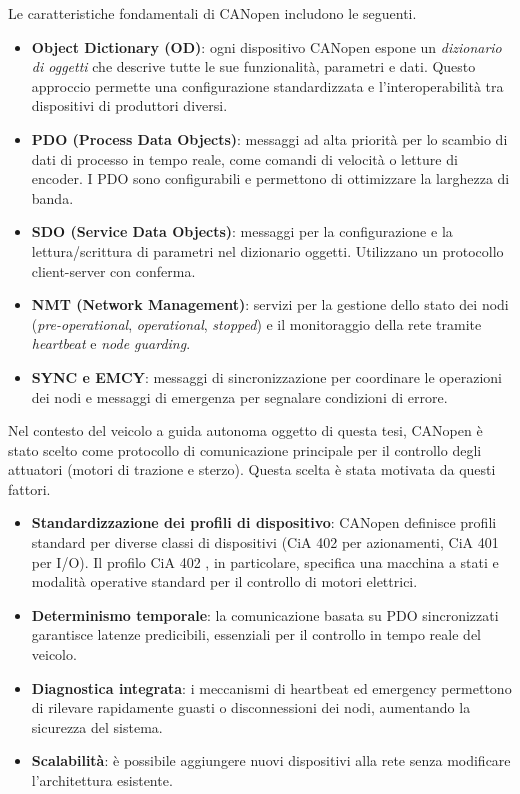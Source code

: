 Le caratteristiche fondamentali di CANopen includono le seguenti.
\begin{itemize}
    \item \textbf{Object Dictionary (OD)}: ogni dispositivo CANopen espone un \textit{dizionario di oggetti} che descrive tutte le sue funzionalità, parametri e dati. Questo approccio permette una configurazione standardizzata e l'interoperabilità tra dispositivi di produttori diversi.
    \item \textbf{PDO (Process Data Objects)}: messaggi ad alta priorità per lo scambio di dati di processo in tempo reale, come comandi di velocità o letture di encoder. I PDO sono configurabili e permettono di ottimizzare la larghezza di banda.
    \item \textbf{SDO (Service Data Objects)}: messaggi per la configurazione e la lettura/scrittura di parametri nel dizionario oggetti. Utilizzano un protocollo client-server con conferma.
    \item \textbf{NMT (Network Management)}: servizi per la gestione dello stato dei nodi (\textit{pre-operational}, \textit{operational}, \textit{stopped}) e il monitoraggio della rete tramite \textit{heartbeat} e \textit{node guarding}.
    \item \textbf{SYNC e EMCY}: messaggi di sincronizzazione per coordinare le operazioni dei nodi e messaggi di emergenza per segnalare condizioni di errore.
\end{itemize}

Nel contesto del veicolo a guida autonoma oggetto di questa tesi, CANopen è stato scelto come protocollo di comunicazione principale per il controllo degli attuatori (motori di trazione e sterzo). Questa scelta è stata motivata da questi fattori.
\begin{itemize}
    \item \textbf{Standardizzazione dei profili di dispositivo}: CANopen definisce profili standard per diverse classi di dispositivi (CiA 402 per azionamenti, CiA 401 per I/O). Il profilo CiA 402 \cite{cia402}, in particolare, specifica una macchina a stati e modalità operative standard per il controllo di motori elettrici.
    \item \textbf{Determinismo temporale}: la comunicazione basata su PDO sincronizzati garantisce latenze predicibili, essenziali per il controllo in tempo reale del veicolo.
    \item \textbf{Diagnostica integrata}: i meccanismi di heartbeat ed emergency permettono di rilevare rapidamente guasti o disconnessioni dei nodi, aumentando la sicurezza del sistema.
    \item \textbf{Scalabilità}: è possibile aggiungere nuovi dispositivi alla rete senza modificare l'architettura esistente.
\end{itemize}

